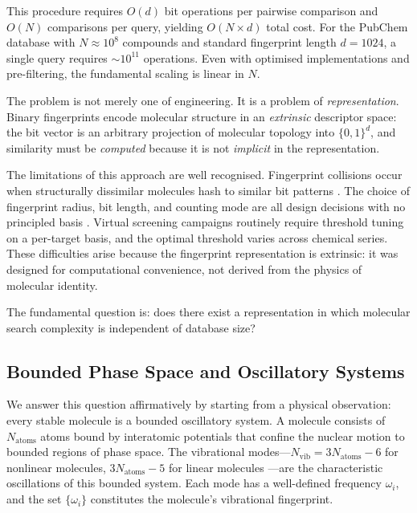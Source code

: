 \documentclass[11pt,twocolumn,a4paper]{article}
\theoremstyle{definition}
\theoremstyle{remark}
\newcommand{\Nvib}{N_{\mathrm{vib}}}
\begin{document}
This procedure requires $O(d)$ bit operations per pairwise comparison and $O(N)$ comparisons per query, yielding $O(N \times d)$ total cost. For the PubChem database \citep{kim2023} with $N \approx 10^8$ compounds and standard fingerprint length $d = 1024$, a single query requires $\sim 10^{11}$ operations. Even with optimised implementations and pre-filtering, the fundamental scaling is linear in $N$.

The problem is not merely one of engineering. It is a problem of \emph{representation}. Binary fingerprints encode molecular structure in an \emph{extrinsic} descriptor space: the bit vector is an arbitrary projection of molecular topology into $\{0,1\}^d$, and similarity must be \emph{computed} because it is not \emph{implicit} in the representation.

The limitations of this approach are well recognised. Fingerprint collisions occur when structurally dissimilar molecules hash to similar bit patterns \citep{riniker2013}. The choice of fingerprint radius, bit length, and counting mode are all design decisions with no principled basis \citep{bajusz2015}. Virtual screening campaigns routinely require threshold tuning on a per-target basis, and the optimal threshold varies across chemical series. These difficulties arise because the fingerprint representation is extrinsic: it was designed for computational convenience, not derived from the physics of molecular identity.

The fundamental question is: does there exist a representation in which molecular search complexity is independent of database size?

\subsection{Bounded Phase Space and Oscillatory Systems}

We answer this question affirmatively by starting from a physical observation: every stable molecule is a bounded oscillatory system. A molecule consists of $N_{\mathrm{atoms}}$ atoms bound by interatomic potentials that confine the nuclear motion to bounded regions of phase space. The vibrational modes---$\Nvib = 3N_{\mathrm{atoms}} - 6$ for nonlinear molecules, $3N_{\mathrm{atoms}} - 5$ for linear molecules \citep{wilson1955}---are the characteristic oscillations of this bounded system. Each mode has a well-defined frequency $\omega_i$, and the set $\{\omega_i\}$ constitutes the molecule's vibrational fingerprint.
\end{document}
